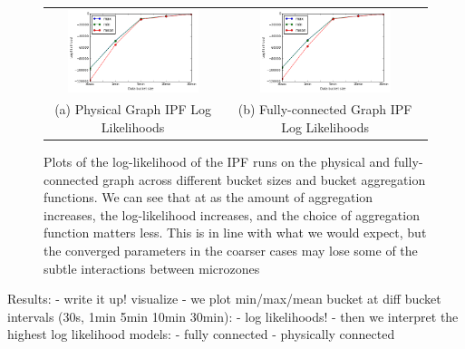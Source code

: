 \begin{figure}
\centering
\begin{tabular}{cc}
\includegraphics[width=1.5in]{figs/physical_loglikelihood} & \includegraphics[width=1.5in]{figs/full_loglikelihood} \\
(a) Physical Graph IPF Log Likelihoods & (b) Fully-connected Graph IPF Log Likelihoods \\[6pt]
\end{tabular}
\caption{Plots of the log-likelihood of the IPF runs on the physical and fully-connected graph across different bucket sizes and bucket aggregation functions. We can see that at as the amount of aggregation increases, the log-likelihood increases, and the choice of aggregation function matters less. This is in line with what we would expect, but the converged parameters in the coarser cases may lose some of the subtle interactions between microzones}
\label{fig:loglikelihood}
\end{figure}

Results:
- write it up! visualize
- we plot min/max/mean bucket at diff bucket intervals (30s, 1min 5min 10min 30min):
    - log likelihoods!
- then we interpret the highest log likelihood models:
    - fully connected
    - physically connected
\fi
